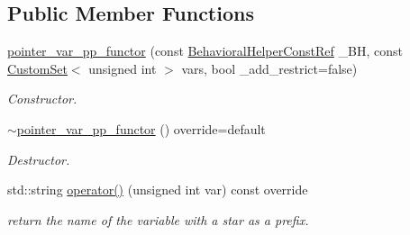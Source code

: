 \subsection*{Public Member Functions}
\begin{DoxyCompactItemize}
\item 
\hyperlink{structpointer__var__pp__functor_a56819704530f63219caf27695b298e83}{pointer\+\_\+var\+\_\+pp\+\_\+functor} (const \hyperlink{behavioral__helper_8hpp_aae973b54cac87eef3b27442aa3e1e425}{Behavioral\+Helper\+Const\+Ref} \+\_\+\+BH, const \hyperlink{custom__set_8hpp_a615bc2f42fc38a4bb1790d12c759e86f}{Custom\+Set}$<$ unsigned int $>$ vars, bool \+\_\+add\+\_\+restrict=false)
\begin{DoxyCompactList}\small\item\em Constructor. \end{DoxyCompactList}\item 
\hyperlink{structpointer__var__pp__functor_aabdb9908f1885bb2e1bfc396795e36ef}{$\sim$pointer\+\_\+var\+\_\+pp\+\_\+functor} () override=default
\begin{DoxyCompactList}\small\item\em Destructor. \end{DoxyCompactList}\item 
std\+::string \hyperlink{structpointer__var__pp__functor_a89023532351352a1ce6a9d40d9ec5e2c}{operator()} (unsigned int var) const override
\begin{DoxyCompactList}\small\item\em return the name of the variable with a star as a prefix. \end{DoxyCompactList}\end{DoxyCompactItemize}
